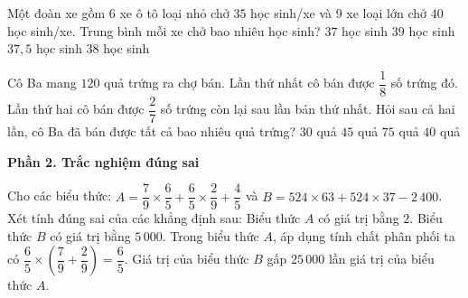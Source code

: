 \begin{ex} %
Một đoàn xe gồm $6$ xe ô tô loại nhỏ chở $35$ học sinh/xe và $9$ xe loại lớn chở $40$ học sinh/xe. Trung bình mỗi xe chở bao nhiêu học sinh?
\choice
{$37$ học sinh}
{$39$ học sinh}
{$37{,}5$ học sinh}
{\True $38$ học sinh}
\end{ex}

\begin{ex} %
Cô Ba mang $120$ quả trứng ra chợ bán. Lần thứ nhất cô bán được $\dfrac{1}{8}$ số trứng đó. Lần thứ hai cô bán được $\dfrac{2}{7}$ số trứng còn lại sau lần bán thứ nhất. Hỏi sau cả hai lần, cô Ba đã bán được tất cả bao nhiêu quả trứng?
\choice
{$30$ quả}
{\True $45$ quả}
{$75$ quả}
{$40$ quả}
\end{ex}

\textbf{Phần 2. Trắc nghiệm đúng sai}

\begin{ex} %
Cho các biểu thức: $A = \dfrac{7}{9} \times \dfrac{6}{5} + \dfrac{6}{5} \times \dfrac{2}{9} + \dfrac{4}{5}$ và $B = 524 \times 63 + 524 \times 37 - 2\,400$. Xét tính đúng sai của các khẳng định sau:
\choiceTF
{\True Biểu thức $A$ có giá trị bằng $2$.}
{Biểu thức $B$ có giá trị bằng $5\,000$.}
{\True Trong biểu thức $A$, áp dụng tính chất phân phối ta có $\dfrac{6}{5} \times \left(\dfrac{7}{9} + \dfrac{2}{9}\right) = \dfrac{6}{5}$.}
{\True Giá trị của biểu thức $B$ gấp $25\,000$ lần giá trị của biểu thức $A$.}
\end{ex}

